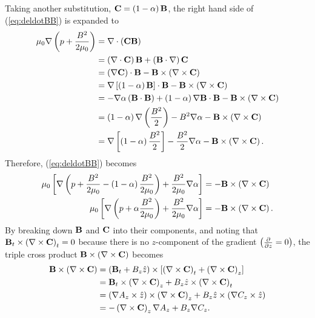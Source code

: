 Taking another substitution, $\mathbf{C} = \left( 1-\alpha \right)\mathbf{B}$, the right hand side of (\ref{eq:deldotBB}) is expanded to
\[\begin{split}
    \mu_0\nabla\left( p + \frac{B^2}{2\mu_0} \right) &= \nabla \cdot\left( \mathbf{C}\mathbf{B} \right) \\
    &= \left( \nabla \cdot\mathbf{C} \right)\mathbf{B} + \left( \mathbf{B}\cdot\nabla \right)\mathbf{C} \\
    &= \left( \nabla \mathbf{C} \right)\cdot\mathbf{B} - \mathbf{B}\times\left( \nabla \times \mathbf{C} \right) \\
    &= \nabla\left[ \left( 1-\alpha \right)\mathbf{B} \right]\cdot\mathbf{B} - \mathbf{B}\times\left( \nabla \times \mathbf{C} \right) \\
    &= -\nabla\alpha\left( \mathbf{B}\cdot\mathbf{B} \right) + \left( 1-\alpha \right)\nabla\mathbf{B}\cdot\mathbf{B} - \mathbf{B}\times\left( \nabla \times \mathbf{C} \right) \\
    &= \left( 1-\alpha \right)\nabla\left( \frac{B^2}{2} \right) - B^2\nabla\alpha - \mathbf{B}\times\left( \nabla \times \mathbf{C} \right) \\
    &= \nabla\left[ \left( 1-\alpha \right)\frac{B^2}{2} \right] - \frac{B^2}{2}\nabla\alpha - \mathbf{B}\times\left( \nabla \times \mathbf{C} \right). \\
\end{split}\]
Therefore, (\ref{eq:deldotBB}) becomes
\begin{equation}
    \begin{split}
        \mu_0\left[ \nabla\left( p + \frac{B^2}{2\mu_0} - \left( 1-\alpha \right)\frac{B^2}{2\mu_0} \right) + \frac{B^2}{2\mu_0}\nabla\alpha \right] &= -\mathbf{B}\times\left( \nabla \times \mathbf{C} \right) \\
        \mu_0\left[ \nabla\left( p + \alpha\frac{B^2}{2\mu_0} \right) + \frac{B^2}{2\mu_0}\nabla\alpha \right] &= -\mathbf{B}\times\left( \nabla \times \mathbf{C} \right). \\
        \label{eq:B-cross-del-cross-C}
    \end{split}
\end{equation}
By breaking down $\mathbf{B}$ and $\mathbf{C}$ into their components, and noting that $\mathbf{B}_t \times \left( \nabla \times\mathbf{C} \right)_t =0$ because there is no $z$-component of the gradient $\left( \frac{\partial}{\partial z}=0 \right)$, the triple cross product $\mathbf{B}\times\left( \nabla \times\mathbf{C} \right)$ becomes
\[\begin{split}
    \mathbf{B}\times\left( \nabla \times\mathbf{C} \right) &= \left( \mathbf{B}_t + B_z\hat{z} \right)\times\left[ \left( \nabla \times\mathbf{C} \right)_t + \left( \nabla \times\mathbf{C} \right)_z \right] \\
    &= \mathbf{B}_t\times \left( \nabla \times\mathbf{C} \right)_z + B_z\hat{z}\times\left( \nabla \times\mathbf{C} \right)_t \\
    &= \left( \nabla A_z\times\hat{z} \right)\times \left( \nabla \times\mathbf{C} \right)_z + B_z\hat{z} \times \left( \nabla C_z\times\hat{z} \right) \\
    &= -\left( \nabla \times\mathbf{C} \right)_z\nabla A_z +  B_z\nabla C_z. \\
\end{split}\]
